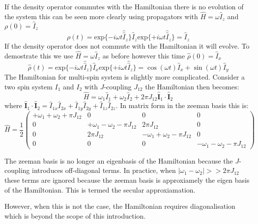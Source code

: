 If the density operator commutes with the Hamiltonian there is no evolution of the system
this can be seen more clearly using propagators with $\hat{H} = \omega\hat{I}_z$ and $\rho(0) = \hat{I}_z$
\begin{equation}
  \rho(t) = \text{exp}\{-i\omega t\hat{\hat{I}}_z\}\hat{I}_z\text{exp}\{+i\omega t\hat{\hat{I}}_z\} = \hat{I}_z
\end{equation}
If the density operator does not commute with the Hamiltonian it will evolve. To demostrate this we use $\hat{H} = \omega\hat{I}_z$ as before  however this time $\hat\rho(0) = \hat{I}_x$
\begin{equation}
  \hat\rho(t) = \text{exp}\{-i\omega t\hat{\hat{I}}_z\}\hat{I}_x\text{exp}\{+i\omega t\hat{\hat{I}}_z\} = \cos(\omega t)\hat{I}_x + \sin(\omega t)\hat{I}_y
\end{equation}
The Hamiltonian for multi-spin system is slightly more complicated. Consider a two spin
system $I_1$ and $I_2$ with $J$-coupling $J_{12}$ the Hamiltonian then becomes:
\begin{equation}
  \hat{H} = \omega_1\hat{I}_1 + \omega_2\hat{I}_2 + 2\pi J_{12}\hat{\mathbf{I}}_1\cdot\hat{\mathbf{I}}_2
\end{equation}
where $\hat{\mathbf{I}}_1\cdot\hat{\mathbf{I}}_2 = \hat{I}_{1x}\hat{I}_{2x} + \hat{I}_{1y}\hat{I}_{2y} + \hat{I}_{1z}\hat{I}_{2z}$.
In matrix form in the zeeman basis this is:
\begin{equation}
  \hat{H} = \frac{1}{2}\begin{pmatrix}
    +\omega_1 + \omega_2 + \pi J_{12} & 0 & 0 & 0\\
    0 & +\omega_1 - \omega_2 - \pi J_{12} & 2\pi J_{12} & 0\\
    0 & 2\pi J_{12} & -\omega_1 + \omega_2 - \pi J_{12} & 0\\
    0 & 0 & 0 & -\omega_1 - \omega_2 - \pi J_{12}
\end{pmatrix}
\end{equation}

The zeeman basis is no longer an eigenbasis of the Hamiltonian because the $J$-coupling
introduces off-diagonal terms. In practice, when $|\omega_1-\omega_2| >> 2\pi J_{12}$
these terms are ignored because the zeeman basis is approxiamely the eigen basis of the Hamiltonian. This is termed the secular approxiamation.

However, when this is not the case, the Hamiltonian requires diagonalisation which is beyond the scope of this introduction.

\newpage

